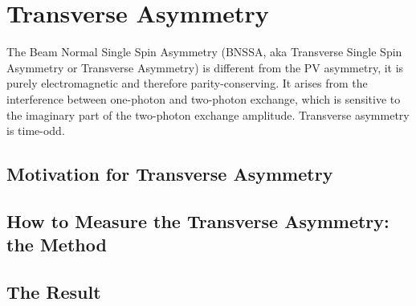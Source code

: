 \chapter{Transverse Asymmetry}
The Beam Normal Single Spin Asymmetry (BNSSA, aka Transverse Single Spin Asymmetry
or Transverse Asymmetry) is different from the PV asymmetry, it is purely 
electromagnetic and therefore parity-conserving. It arises from the interference
between one-photon and two-photon exchange, which is sensitive to the imaginary
part of the two-photon exchange amplitude. Transverse asymmetry is time-odd.

\section{Motivation for Transverse Asymmetry}

\section{How to Measure the Transverse Asymmetry: the Method}

\section{The Result}

